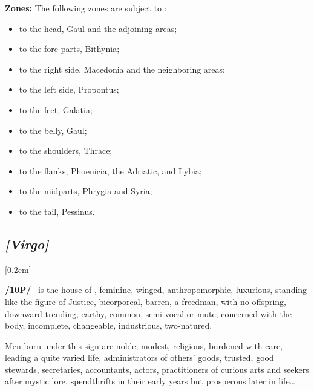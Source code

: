 \textbf{Zones: } The following zones are subject to \Leo: 
\begin{itemize}
\item to the head, Gaul and the adjoining areas; 
\item to the fore parts, Bithynia; 
\item to the right side, Macedonia and the neighboring areas; \item to the left side, Propontus; 
\item to the feet, Galatia; 
\item to the belly, Gaul; 
\item to the shoulders, Thrace; 
\item to the flanks, Phoenicia, the Adriatic, and Lybia; 
\item to the midparts, Phrygia and Syria; 
\item to the tail, Pessinus.
\end{itemize}

\secbr
\subsection{\textit{[Virgo]}}
[0.2cm]

\textbf{/10P/}  \Virgo\, is the house of \Mercury,  feminine, winged, anthropomorphic, luxurious, standing like the figure of Justice,  bicorporeal, barren, a freedman, with no offspring, downward-trending,  earthy,  common,  semi-vocal or  mute, concerned with the body, incomplete, changeable, industrious,  two-natured. 

Men born under this sign are noble, modest, religious, burdened with care, leading a quite varied life, administrators of others’ goods, trusted, good stewards, secretaries, accountants, actors, practitioners of curious arts and seekers after mystic lore, spendthrifts in their early years but prosperous later in life\ldots 

